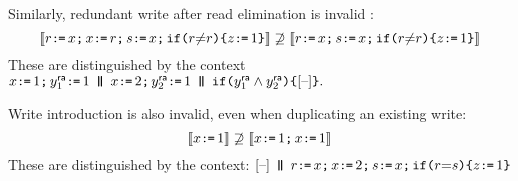 
Similarly, redundant write after read elimination is invalid \citet[-4]{SevcikThesis}:
\begin{displaymath}
  \sem{r\GETS x\SEMI x\GETS r\SEMI s\GETS x \SEMI \IF{\aReg {\neq} \aReg} \THEN \cLoc \GETS 1 \FI}
  \not\supseteq
  \sem{r\GETS x\SEMI s\GETS x  \SEMI \IF{\aReg {\neq} \aReg} \THEN \cLoc \GETS 1 \FI}
\end{displaymath}
These are distinguished by the context %
\begin{math}
  x\GETS1 \SEMI y_1^\modeRA\GETS 1
  \PAR x\GETS2 \SEMI y_2^\modeRA\GETS 1
  \PAR \IF{y_1^\modeRA \land y_2^\modeRA} \THEN \hole{}\FI.
\end{math}

Write introduction is also invalid, even when duplicating an existing write:
\begin{displaymath}
  \sem{\aLoc \GETS 1} 
  \not\supseteq
  \sem{\aLoc \GETS 1 \SEMI \aLoc \GETS 1}
\end{displaymath}
These are distinguished by the context:
\begin{math}
  \hole{} \PAR
  r\GETS x \SEMI
  x\GETS2 \SEMI
  s\GETS x\SEMI
  \IF{\aReg {=} \bReg} \THEN \cLoc \GETS 1 \FI
\end{math}









